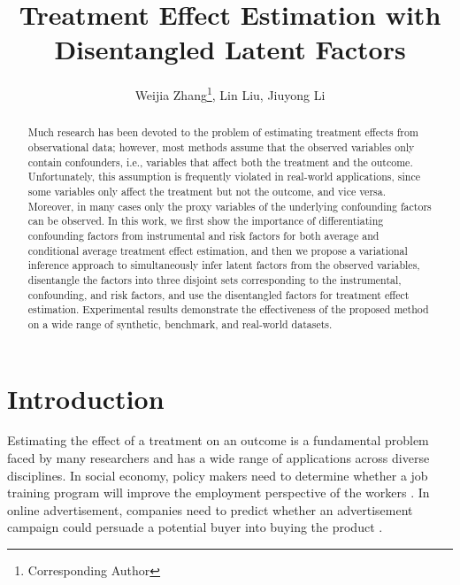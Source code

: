 \documentclass[letterpaper]{article} %
\title{Treatment Effect Estimation with Disentangled Latent Factors}
\author {
        Weijia Zhang\footnote{Corresponding Author},
        Lin Liu,
        Jiuyong Li \\
}
\begin{document}
\maketitle

\begin{abstract}
Much research has been devoted to the problem of estimating treatment effects from observational data; however, most methods assume that the observed variables only contain confounders, i.e., variables that affect both the treatment and the outcome. Unfortunately, this assumption is frequently violated in real-world applications, since some variables only affect the treatment but not the outcome, and vice versa. Moreover, in many cases only the proxy variables of the underlying confounding factors can be observed. 
In this work, we first show the importance of differentiating confounding factors from instrumental and risk factors for both average and conditional average treatment effect estimation, and then we propose a variational inference approach to simultaneously infer latent factors from the observed variables, disentangle the factors into three disjoint sets corresponding to the instrumental, confounding, and risk factors, and use the disentangled factors for treatment effect estimation.
Experimental results demonstrate the effectiveness of the proposed method on a wide range of synthetic, benchmark, and real-world datasets.
\end{abstract}

\section*{Introduction}
Estimating the effect of a treatment on an outcome is a fundamental problem faced by many researchers and has a wide range of applications across diverse disciplines.
In social economy, policy makers need to determine whether a job training program will improve the employment perspective of the workers \cite{Athey2015}. 
In online advertisement, companies need to predict whether an advertisement campaign could persuade a potential buyer into buying the product \cite{Rzepakowski2011}. 
\end{document}
